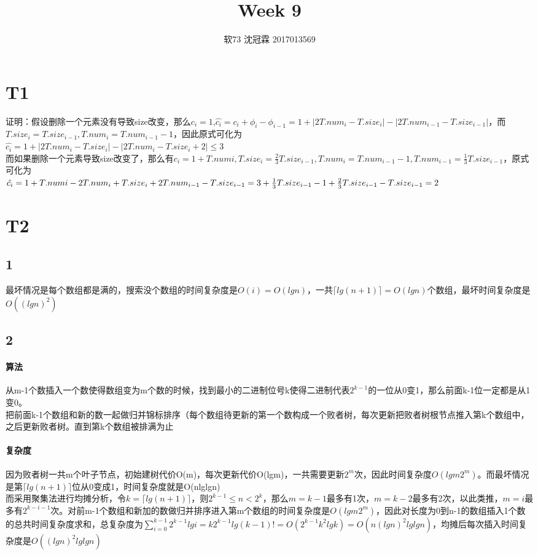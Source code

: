 \documentclass{article}
\title{Week 9}
\author{软73 沈冠霖 2017013569}
\begin{document}
\begin{CJK}{UTF8}{gkai}
\maketitle
\section{T1} 
证明：假设删除一个元素没有导致size改变，那么$c_{i}=1$,$\hat{c_{i}}=c_{i}+\phi_{i}-\phi_{i-1}=1+|2T.num_{i}-T.size_{i}|-|2T.num_{i-1}-T.size_{i-1}|$，而$T.size_{i} = T.size_{i-1},T.num_{i}=T.num_{i-1}-1$，因此原式可化为\\
$\hat{c_{i}}=1+|2T.num_{i}-T.size_{i}|-|2T.num_{i}-T.size_{i}+2|\leq 3$\\
而如果删除一个元素导致size改变了，那么有$c_{i}=1+T.num{i},T.size_{i} = \frac{2}{3}T.size_{i-1},T.num_{i}=T.num_{i-1}-1,T.num_{i-1}=\frac{1}{3}T.size_{i-1}$，原式可化为\\
$\hat{c_{i}}=1+T.num{i}-2T.num_{i}+T.size_{i}+2T.num_{i-1}-T.size_{i-1}\\
=3+\frac{1}{3}T.size_{i-1}-1+\frac{2}{3}T.size_{i-1}-T.size_{i-1}=2$
\section{T2} 
\subsection{1}
最坏情况是每个数组都是满的，搜索没个数组的时间复杂度是$O(i)=O(lgn)$，一共$\lceil lg(n+1) \rceil=O(lgn)$个数组，最坏时间复杂度是$O((lgn)^{2})$\\
\subsection{2}
\paragraph{算法}
从m-1个数插入一个数使得数组变为m个数的时候，找到最小的二进制位号k使得二进制代表$2^{k-1}$的一位从0变1，那么前面k-1位一定都是从1变0。\\
把前面k-1个数组和新的数一起做归并锦标排序（每个数组待更新的第一个数构成一个败者树，每次更新把败者树根节点推入第k个数组中，之后更新败者树。直到第k个数组被排满为止\\
\paragraph{复杂度}
因为败者树一共m个叶子节点，初始建树代价O(m)，每次更新代价O(lgm)，一共需要更新$2^{m}$次，因此时间复杂度$O(lgm2^{m})$。而最坏情况是第$\lceil lg(n+1) \rceil$位从0变成1，时间复杂度就是O(nlglgn)\\
而采用聚集法进行均摊分析，令$k=\lceil lg(n+1) \rceil$，则$2^{k-1}\leq n <2^{k}$，那么$m=k-1$最多有1次，$m=k-2$最多有2次，以此类推，$m=i$最多有$2^{k-i-1}$次。对前m-1个数组和新加的数做归并排序进入第m个数组的时间复杂度是$O(lgm2^{m})$，因此对长度为0到n-1的数组插入1个数的总共时间复杂度求和，总复杂度为$\sum_{i=0}^{k-1}2^{k-1}lgi =k2^{k-1}lg(k-1)!=O(2^{k-1}k^{2}lgk)=O(n(lgn)^{2}lglgn) $，均摊后每次插入时间复杂度是$O((lgn)^{2}lglgn)$

\end{CJK}
\end{document}
